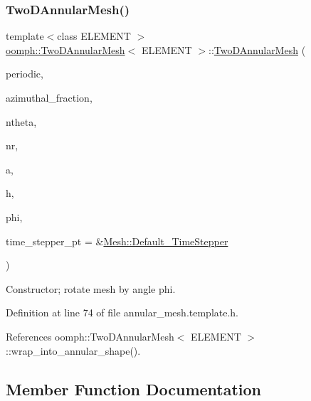 \subsubsection{\texorpdfstring{Two\+D\+Annular\+Mesh()}{TwoDAnnularMesh()}\hspace{0.1cm}{\footnotesize\ttfamily [2/2]}}
{\footnotesize\ttfamily template$<$class E\+L\+E\+M\+E\+NT $>$ \\
\hyperlink{classoomph_1_1TwoDAnnularMesh}{oomph\+::\+Two\+D\+Annular\+Mesh}$<$ E\+L\+E\+M\+E\+NT $>$\+::\hyperlink{classoomph_1_1TwoDAnnularMesh}{Two\+D\+Annular\+Mesh} (\begin{DoxyParamCaption}\item[{const bool \&}]{periodic,  }\item[{const double \&}]{azimuthal\+\_\+fraction,  }\item[{const unsigned \&}]{ntheta,  }\item[{const unsigned \&}]{nr,  }\item[{const double \&}]{a,  }\item[{const double \&}]{h,  }\item[{const double \&}]{phi,  }\item[{\hyperlink{classoomph_1_1TimeStepper}{Time\+Stepper} $\ast$}]{time\+\_\+stepper\+\_\+pt = {\ttfamily \&\hyperlink{classoomph_1_1Mesh_a12243d0fee2b1fcee729ee5a4777ea10}{Mesh\+::\+Default\+\_\+\+Time\+Stepper}} }\end{DoxyParamCaption})\hspace{0.3cm}{\ttfamily [inline]}}



Constructor; rotate mesh by angle phi. 



Definition at line 74 of file annular\+\_\+mesh.\+template.\+h.



References oomph\+::\+Two\+D\+Annular\+Mesh$<$ E\+L\+E\+M\+E\+N\+T $>$\+::wrap\+\_\+into\+\_\+annular\+\_\+shape().



\subsection{Member Function Documentation}
\mbox{\label{classoomph_1_1TwoDAnnularMesh_adcf4ce1aefcce7a773c66ff0f496df9e}} 
